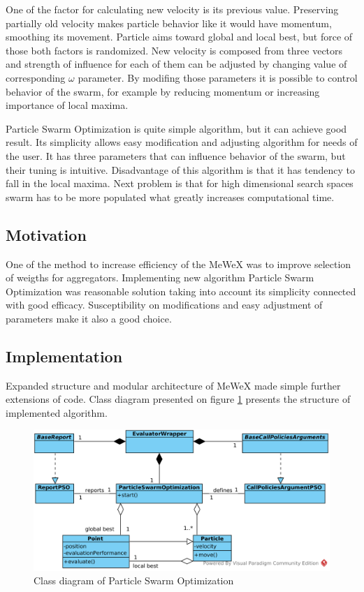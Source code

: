 One of the factor for calculating new velocity is its previous value. Preserving partially old velocity makes particle behavior 
like it would have momentum, smoothing its movement. Particle aims toward global and local best, but force of those both factors is randomized.
New velocity is composed from three vectors and strength of influence for each of them can be adjusted by changing value 
of corresponding \(\omega\) parameter. By modifing those parameters it is possible to control behavior of the swarm, for example 
by reducing momentum or increasing importance of local maxima.

Particle Swarm Optimization is quite simple algorithm, but it can achieve good result. Its simplicity allows easy modification and adjusting 
algorithm for needs of the user. It has three parameters that can influence behavior of the swarm, but their tuning is intuitive. 
Disadvantage of this algorithm is that it has tendency to fall in the local maxima. Next problem is that for high dimensional search spaces 
swarm has to be more populated what greatly increases computational time. 

\subsection{Motivation}
One of the method to increase efficiency of the MeWeX was to improve selection of weigths for aggregators. 
Implementing new algorithm Particle Swarm Optimization was reasonable solution taking into account its simplicity 
connected with good efficacy. Susceptibility on modifications and easy adjustment of parameters make it also a good choice.

\subsection{Implementation}
Expanded structure and modular architecture of MeWeX made simple further extensions of code. Class diagram presented on figure \ref{img_pso_class}
presents the structure of implemented algorithm.
\begin{figure}[ht]
\centering
    \includegraphics[scale=0.2]{img/pso_class.png}
    \caption{Class diagram of Particle Swarm Optimization}
    \label{img_pso_class}
\end{figure}


